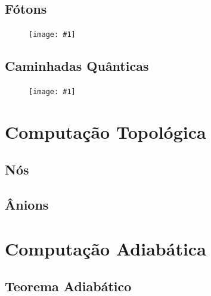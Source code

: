 \documentclass{beamer}
\newcommand{\imgw}[2]{%
\begin{center}
	\begin{figure}
	\texttt{[image: \#1]}\\
	\end{figure}
\end{center}
}
\begin{document}
	\subsection{Fótons}	
	
	\begin{frame}{\subsecname}
		\imgw{superposition.pdf}{\textwidth}
	\end{frame}
	
	\subsection{Caminhadas Quânticas}
	
	\begin{frame}{\subsecname}
		\imgw{superposition.pdf}{\textwidth}
	\end{frame}

	\section{Computação Topológica}
	
	\subsection{Nós}
	
	\begin{frame}{\subsecname}
	
	\end{frame}	
	
	\begin{frame}{\subsecname}
	
	\end{frame}
	
	\subsection{Ânions}
	
	\begin{frame}{\subsecname}
	
	\end{frame}	
	
	\begin{frame}{\subsecname}
	
	\end{frame}
	
	\section{Computação Adiabática}
	
	\subsection{Teorema Adiabático}
	
\end{document}
